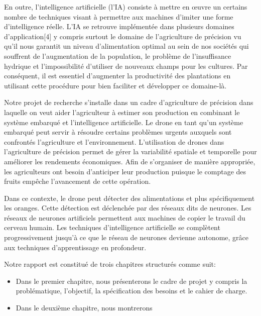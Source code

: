 En outre, l’intelligence artificielle (l’IA) consiste à mettre en œuvre un certains nombre de techniques visant à permettre aux machines d'imiter une forme d'intelligence réelle. L'IA se retrouve implémentée dans plusieurs domaines d'application[4] y compris surtout le domaine de l’agriculture de précision vu qu'il nous garantit un niveau d'alimentation optimal au sein de nos sociétés qui souffrent de l’augmentation de la population, le problème de l’insuffisance hydrique et l’impossibilité d’utiliser de nouveaux champs pour les cultures. Par conséquent, il est essentiel d’augmenter la productivité des plantations en utilisant cette procédure pour bien faciliter et développer ce domaine-là.



Notre projet de recherche s’installe dans un cadre d’agriculture de précision dans laquelle on veut aider l’agriculteur à estimer son production en combinant le système embarqué et l’intelligence artificielle. Le drone en tant qu’un système embarqué peut servir à résoudre certains problèmes urgents auxquels sont confrontés l'agriculture et l'environnement. L'utilisation de drones dans l'agriculture de précision permet de gérer la variabilité spatiale et temporelle pour améliorer les rendements économiques. Afin de s’organiser de manière appropriée, les agriculteurs ont besoin d’anticiper leur production puisque le comptage des fruits empêche l'avancement de cette opération.



Dans ce contexte, le drone peut détecter des alimentations et plus spécifiquement les oranges. Cette détection est déclenchée par des réseaux dits de neurones. Les réseaux de neurones artificiels permettent aux machines de copier le travail du cerveau humain. Les techniques d'intelligence artificielle se complètent progressivement jusqu'à ce que le réseau de neurones devienne autonome, grâce aux techniques d'apprentissage en profondeur.


Notre rapport est constitué de trois chapitres structurés comme suit:

\begin{itemize}
	\item Dans le premier chapitre, nous présenterons le cadre de projet y compris la problématique, l'objectif, la spécification des besoins et le cahier de charge.
	\item Dans le deuxième chapitre, nous montrerons 
\end{itemize}
	
	
	
	
	
	
	
	
